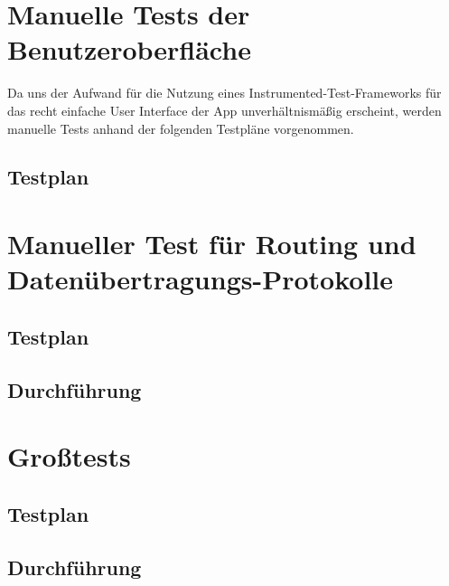 




\clearpage

\section{Manuelle Tests der Benutzeroberfläche}

Da uns der Aufwand für die Nutzung eines Instrumented-Test-Frameworks
für das recht einfache User Interface der App unverhältnismäßig
erscheint, werden manuelle Tests anhand der folgenden Testpläne
vorgenommen.

\subsection{Testplan}





\clearpage
\section{Manueller Test für Routing und Datenübertragungs-Protokolle}
\subsection{Testplan}


\subsection{Durchführung}


\section{Großtests}
\subsection{Testplan}

\subsection{Durchführung}

